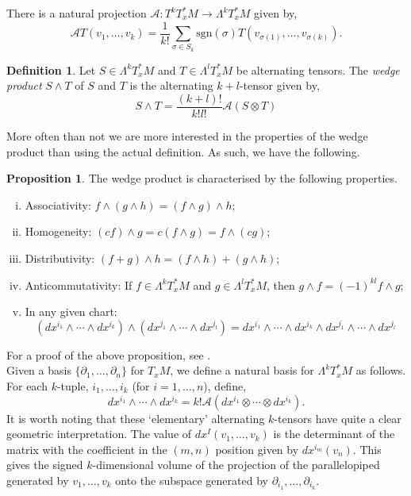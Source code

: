 \documentclass[12pt,a4paper]{article}
\numberwithin{equation}{section}
\theoremstyle{definition}
\newtheorem{definition}{Definition}[section]
\newtheorem{proposition}{Proposition}[section]
\theoremstyle{remark}
\begin{document}
There is a natural projection $\mathcal{A}:T^kT^*_xM\to\Lambda^kT^*_xM$ given by,
\[
\mathcal{A}T(v_1,\ldots,v_k)=\frac{1}{k!}\sum_{\sigma\in S_k}\mathrm{sgn}(\sigma)T(v_{\sigma(1)},\ldots,v_{\sigma(k)}).
\]
\begin{definition}
Let $S\in\Lambda^kT^*_xM$ and $T\in\Lambda^lT^*_xM$ be alternating tensors. The \textit{wedge product} $S\wedge T$ of $S$ and $T$ is the alternating $k+l$-tensor given by,
\[
S\wedge T=\frac{(k+l)!}{k!l!}\mathcal{A}(S\otimes T)
\]
\end{definition}
More often than not we are more interested in the properties of the wedge product than using the actual definition. As such, we have the following.
\begin{proposition}
The wedge product is characterised by the following properties.
\begin{enumerate}[(i)]
\item Associativity: $f\wedge(g\wedge h)=(f\wedge g)\wedge h$;
\item Homogeneity: $(cf)\wedge g=c(f\wedge g)=f\wedge(cg)$;
\item Distributivity: $(f+g)\wedge h=(f\wedge h)+(g\wedge h)$;
\item Anticommutativity: If $f\in\Lambda^kT^*_xM$ and $g\in\Lambda^l T^*_xM$, then $g\wedge f=(-1)^{kl}f\wedge g$;
\item In any given chart: \[(dx^{i_1}\wedge\cdots\wedge dx^{i_k})\wedge(dx^{j_1}\wedge\cdots\wedge dx^{j_l})=dx^{i_1}\wedge\cdots\wedge dx^{i_k}\wedge dx^{j_1}\wedge\cdots\wedge dx^{j_l} \]
\end{enumerate}
\end{proposition}
For a proof of the above proposition, see \cite{andrews}.\\

Given a basis $\{\partial_1,\ldots,\partial_n\}$ for $T_xM$, we define a natural basis for $\Lambda^kT^*_xM$ as follows. For each $k$-tuple, $i_1,\ldots,i_k$ (for $i=1,\ldots,n$), define,
\[
dx^{i_1}\wedge\cdots\wedge dx^{i_k}=k!\mathcal{A}(dx^{i_1}\otimes\cdots\otimes dx^{i_k}).
\]
It is worth noting that these `elementary' alternating $k$-tensors have quite a clear geometric interpretation. The value of $dx^I(v_1,\ldots,v_k)$ is the determinant of the matrix with the coefficient in the $(m,n)$ position given by $dx^{i_m}(v_n)$. This gives the signed $k$-dimensional volume of the projection of the parallelopiped generated by $v_1,\ldots,v_k$ onto the subspace generated by $\partial_{i_1},\ldots,\partial_{i_k}$.\\
\end{document}

